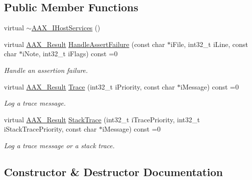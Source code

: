 \subsection*{Public Member Functions}
\begin{DoxyCompactItemize}
\item 
virtual \mbox{\hyperlink{a01841_a504167c87343284982c0d9b13305c619}{$\sim$\+A\+A\+X\+\_\+\+I\+Host\+Services}} ()
\item 
virtual \mbox{\hyperlink{a00392_a4d8f69a697df7f70c3a8e9b8ee130d2f}{A\+A\+X\+\_\+\+Result}} \mbox{\hyperlink{a01841_a0ee94b4e4e98eed868a28f39d6fbe675}{Handle\+Assert\+Failure}} (const char $\ast$i\+File, int32\+\_\+t i\+Line, const char $\ast$i\+Note, int32\+\_\+t i\+Flags) const =0
\begin{DoxyCompactList}\small\item\em Handle an assertion failure. \end{DoxyCompactList}\item 
virtual \mbox{\hyperlink{a00392_a4d8f69a697df7f70c3a8e9b8ee130d2f}{A\+A\+X\+\_\+\+Result}} \mbox{\hyperlink{a01841_a87ecb31633740f1c2c2e9afda6a0068b}{Trace}} (int32\+\_\+t i\+Priority, const char $\ast$i\+Message) const =0
\begin{DoxyCompactList}\small\item\em Log a trace message. \end{DoxyCompactList}\item 
virtual \mbox{\hyperlink{a00392_a4d8f69a697df7f70c3a8e9b8ee130d2f}{A\+A\+X\+\_\+\+Result}} \mbox{\hyperlink{a01841_a1b55424be317b91810c70b0b1917934f}{Stack\+Trace}} (int32\+\_\+t i\+Trace\+Priority, int32\+\_\+t i\+Stack\+Trace\+Priority, const char $\ast$i\+Message) const =0
\begin{DoxyCompactList}\small\item\em Log a trace message or a stack trace. \end{DoxyCompactList}\end{DoxyCompactItemize}


\subsection{Constructor \& Destructor Documentation}
\mbox{\label{a01841_a504167c87343284982c0d9b13305c619}} 
